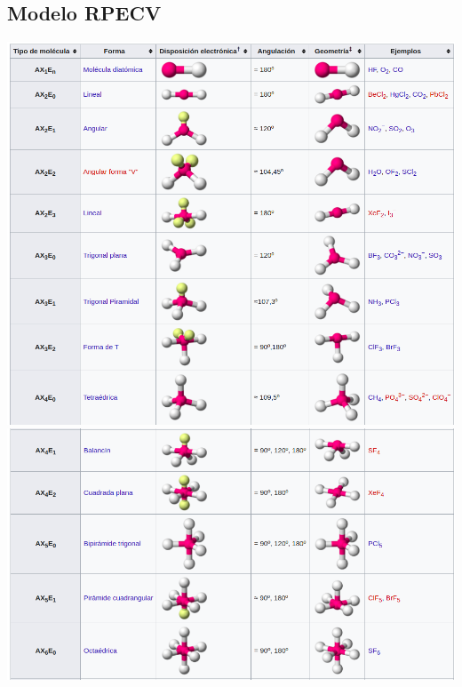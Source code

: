 \documentclass[12pt]{article}
\begin{document}
\subsection{Modelo RPECV}
\includegraphics[scale=0.45]{Geometria1.png}\\
\includegraphics[scale=0.45]{Geometria2.png}\\
\end{document}
